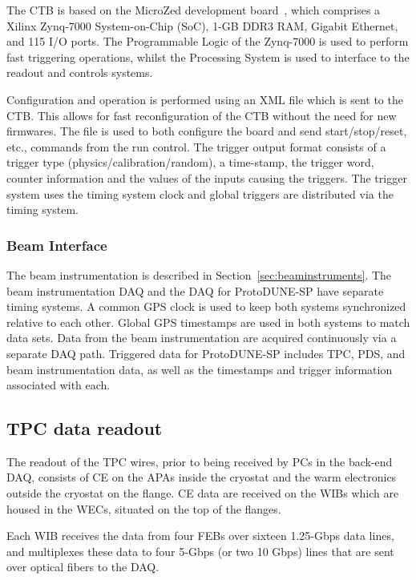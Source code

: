 The CTB is based on the MicroZed development board~\cite{avnet:microzed},
which comprises a Xilinx Zynq-7000 System-on-Chip (SoC), 1-GB DDR3 RAM,
Gigabit Ethernet, and 115 I/O ports.  The Programmable Logic of the
Zynq-7000 is used to perform fast triggering operations, whilst the
Processing System is used to interface to the readout and controls
systems.

Configuration and operation is performed using an XML file which is sent
to the CTB.  This allows for fast reconfiguration of the CTB without
the need for new firmwares.  The file is used to both configure the board
and send start/stop/reset, etc., commands from the run control.
The trigger output format consists of a trigger type (physics/calibration/random),
a time-stamp, the trigger word, counter information and the values 
of the inputs causing the triggers.  
The trigger system uses the timing system clock and global triggers are
distributed via the timing system.  


\subsubsection{Beam Interface}

The beam instrumentation is described in Section~\ref{sec:beaminstruments}.
The beam instrumentation DAQ and the DAQ for ProtoDUNE-SP
have separate timing systems.  A common GPS clock is used to keep both
systems synchronized relative to each other.  Global GPS timestamps are used
in both systems to match data sets.  
Data from the beam
instrumentation are acquired continuously via a separate DAQ path.  Triggered
data for ProtoDUNE-SP includes TPC, PDS, and beam instrumentation data, as well as
the timestamps and trigger information associated with each. 

\subsection{TPC data readout}

The readout of the TPC wires, prior to being received by PCs in
the back-end DAQ, consists of  CE on the APAs
inside the cryostat and the warm electronics outside
the cryostat on the flange.  CE data are received on the WIBs
which are housed in the WECs, situated on the top of the flanges.

Each WIB receives the
data from four FEBs over sixteen 1.25-Gbps data lines, and multiplexes
these data to four 5-Gbps (or two 10 Gbps) lines that are sent over
optical fibers to the DAQ.


